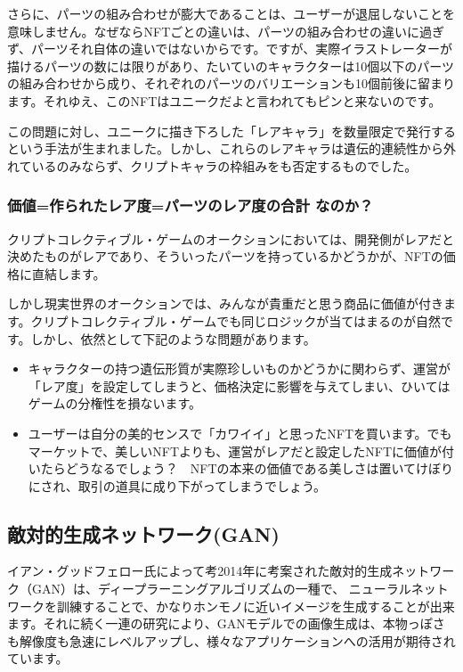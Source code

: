 \documentclass[a4paper]{article}
\begin{document}
さらに、パーツの組み合わせが膨大であることは、ユーザーが退屈しないことを意味しません。なぜならNFTごとの違いは、パーツの組み合わせの違いに過ぎず、パーツそれ自体の違いではないからです。ですが、実際イラストレーターが描けるパーツの数には限りがあり、たいていのキャラクターは10個以下のパーツの組み合わせから成り、それぞれのパーツのバリエーションも10個前後に留まります。それゆえ、このNFTはユニークだよと言われてもピンと来ないのです。

この問題に対し、ユニークに描き下ろした「レアキャラ」を数量限定で発行するという手法が生まれました。しかし、これらのレアキャラは遺伝的連続性から外れているのみならず、クリプトキャラの枠組みをも否定するものでした。

\subsubsection{価値=作られたレア度=パーツのレア度の合計 なのか？}

クリプトコレクティブル・ゲームのオークションにおいては、開発側がレアだと決めたものがレアであり、そういったパーツを持っているかどうかが、NFTの価格に直結します。

しかし現実世界のオークションでは、みんなが貴重だと思う商品に価値が付きます。クリプトコレクティブル・ゲームでも同じロジックが当てはまるのが自然です。しかし、依然として下記のような問題があります。


\begin{itemize}
\item キャラクターの持つ遺伝形質が実際珍しいものかどうかに関わらず、運営が「レア度」を設定してしまうと、価格決定に影響を与えてしまい、ひいてはゲームの分権性を損ないます。
\item ユーザーは自分の美的センスで「カワイイ」と思ったNFTを買います。でもマーケットで、美しいNFTよりも、運営がレアだと設定したNFTに価値が付いたらどうなるでしょう？　NFTの本来の価値である美しさは置いてけぼりにされ、取引の道具に成り下がってしまうでしょう。
\end{itemize}

\subsection{敵対的生成ネットワーク(GAN)}
イアン・グッドフェロー氏によって考2014年に考案された敵対的生成ネットワーク（GAN）\cite{goodfellow2014generative}は、ディープラーニングアルゴリズムの一種で、 ニューラルネットワークを訓練することで、かなりホンモノに近いイメージを生成することが出来ます。それに続く一連の研究により、GANモデルでの画像生成は、本物っぽさも解像度も急速にレベルアップし\cite{radford2015unsupervised,karras2017progressive}、様々なアプリケーションへの活用が期待されています。
\end{document}
